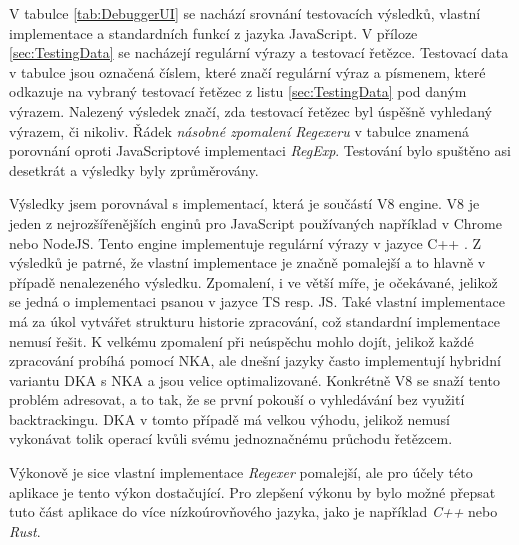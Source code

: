V tabulce \ref{tab:DebuggerUI} se nachází srovnání testovacích výsledků, vlastní implementace a standardních funkcí z jazyka JavaScript.
V příloze \ref{sec:TestingData} se nacházejí regulární výrazy a testovací řetězce. 
Testovací data v tabulce jsou označená číslem, které značí regulární výraz a písmenem, které odkazuje na vybraný testovací řetězec z listu \ref{sec:TestingData} pod daným výrazem.
Nalezený výsledek značí, zda testovací řetězec byl úspěšně vyhledaný výrazem, či nikoliv. 
Řádek \textit{násobné zpomalení Regexeru} v tabulce znamená porovnání oproti JavaScriptové implementaci \textit{RegExp}.
Testování bylo spuštěno asi desetkrát a výsledky byly zprůměrovány.

Výsledky jsem porovnával s implementací, která je součástí V8 engine.
V8 je jeden z nejrozšířenějších enginů pro JavaScript používaných například v Chrome nebo NodeJS.
Tento engine implementuje regulární výrazy v jazyce C++ \cite{Bidlingmaie_2021, Gruber_2017}.
Z výsledků je patrné, že vlastní implementace je značně pomalejší a to hlavně v případě nenalezeného výsledku.
Zpomalení, i ve větší míře, je očekávané, jelikož se jedná o implementaci psanou v jazyce TS resp. JS.
Také vlastní implementace má za úkol vytvářet strukturu historie zpracování, což standardní implementace nemusí řešit.
K velkému zpomalení při neúspěchu mohlo dojít, jelikož každé zpracování probíhá pomocí NKA, ale dnešní jazyky často implementují hybridní variantu DKA s NKA a jsou velice optimalizované.
Konkrétně V8 se snaží tento problém adresovat, a to tak, že se první pokouší o vyhledávání bez využití backtrackingu.
DKA v tomto případě má velkou výhodu, jelikož nemusí vykonávat tolik operací kvůli svému jednoznačnému průchodu řetězcem.

Výkonově je sice vlastní implementace \textit{Regexer} pomalejší, ale pro účely této aplikace je tento výkon dostačující.
Pro zlepšení výkonu by bylo možné přepsat tuto část aplikace do více nízkoúrovňového jazyka, jako je například \textit{C++} nebo \textit{Rust}.
